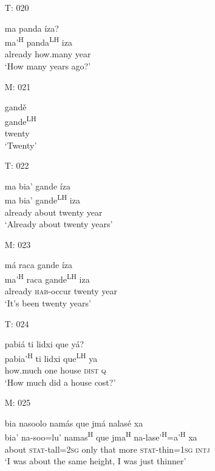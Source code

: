 \begin{itemize}
\item[T: 020]
    
\glll ma panda \'{i}za?\\
ma'\textsuperscript{H} panda\textsuperscript{LH} iza\\
already how.many year\\
\glt `How many years ago?'
 

\item[M: 021]
   
\glll gand\v{e}\\
gande\textsuperscript{LH} \\
twenty\\
\glt `Twenty'
 

\item[T: 022]
   
\glll ma bia' gande \'{i}za \\
ma bia' gande\textsuperscript{LH}  iza \\
already about twenty year\\
\glt `Already about twenty years'
 

\item[M: 023]
   
\glll m\'{a} raca gande \'{i}za\\
ma'\textsuperscript{H} raca gande\textsuperscript{LH} iza\\
already \textsc{hab}-occur twenty year\\
\glt `It's been twenty years'
 


\item[T: 024]
   
\glll pabi\'{a} ti lidxi que y\'{a}?\\
pabia'\textsuperscript{H}  ti lidxi que\textsuperscript{LH}  ya\\
how.much one house \textsc{dist} \textsc{q}\\
\glt `How much did a house cost?'
 

\item[M: 025]
    
\glll bia nasoolo nam\'{a}s que jm\'{a} nalas\'{e} xa\\
bia' na-soo=lu' namas\textsuperscript{H} que jma\textsuperscript{H} na-lase'\textsuperscript{H}=a'\textsuperscript{H} xa\\ 
about \textsc{stat}-tall=\textsc{2sg} only that more \textsc{stat}-thin=\textsc{1sg} \textsc{intj}\\
\glt `I was about the same height, I was just thinner'
 


\end{itemize}
